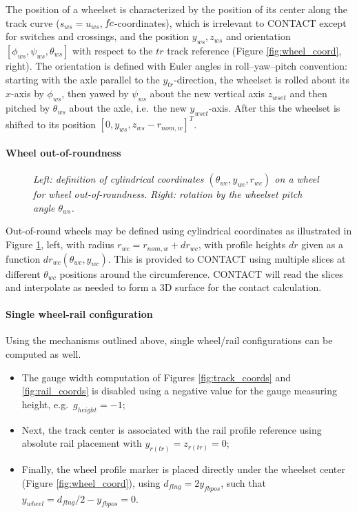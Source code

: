 \documentclass[12pt]{report}
\begin{document}
The position of a wheelset is characterized by the position of its center
along the track curve ($s_{ws}=u_{ws}$, $\mkern-2muf\mkern-2muc$-coordinates), which is
irrelevant to CONTACT except for switches and crossings, and the position
$y_{ws}, z_{ws}$ and orientation $[\phi_{ws}, \psi_{ws}, \theta_{ws}]$ with
respect to the $tr$ track reference (Figure \ref{fig:wheel_coord}, right).
The orientation is defined with Euler angles in roll--yaw--pitch convention:
starting with the axle parallel to the $y_{tr}$-direction, the wheelset is
rolled about its $x$-axis by $\phi_{ws}$, then yawed by $\psi_{ws}$ about
the new vertical axis $z_{wset}$ and then pitched by $\theta_{ws}$ about
the axle, i.e.\ the new $y_{wset}$-axis. After this the wheelset is shifted
to its position $[0,y_{ws},z_{ws}-r_{nom,w}]^T$.

\paragraph{Wheel out-of-roundness}

\begin{figure}[bt]
\centering
{}
\hspace{10mm}
\caption{\em Left: definition of cylindrical coordinates $(\theta_{wc},
        y_{wc},r_{wc})$ on a wheel for wheel out-of-roundness. Right:
        rotation by the wheelset pitch angle $\theta_{ws}$.}
\label{fig:wheel_theta}
\end{figure}

Out-of-round wheels may be defined using cylindrical coordinates as
illustrated in Figure \ref{fig:wheel_theta}, left, with radius
$r_{wc}=r_{nom,w}+dr_{wc}$, with profile heights $dr$ given as a function
$dr_{wc}(\theta_{wc},y_{wc})$. This is provided to
CONTACT using multiple slices at different $\theta_{wc}$ positions
around the circumference. CONTACT will read the slices and interpolate
as needed to form a 3D surface for the contact calculation.

\paragraph{Single wheel-rail configuration}

Using the mechanisms outlined above, single wheel/rail configurations can
be computed as well.
\begin{itemize}
\item The gauge width computation of Figures \ref{fig:track_coords} and
        \ref{fig:rail_coords} is disabled using a negative value for the
        gauge measuring height, e.g.\ $g_{height}=-1$;
\item Next, the track center is associated with the rail profile reference
        using absolute rail placement with $y_{r(tr)}=z_{r(tr)}=0$;
\item Finally, the wheel profile marker is placed directly under the
        wheelset center (Figure \ref{fig:wheel_coord}), using
        $d_{flng}=2 y_{fbpos}$, such that $y_{wheel}=d_{flng}/2-y_{fbpos}=0$.
\end{itemize}
\end{document}
